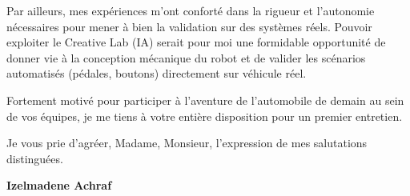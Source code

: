 \documentclass[10pt,a4paper]{../../altacv}
\begin{document}
\vspace{0.4cm}

Par ailleurs, mes expériences m'ont conforté dans la rigueur et l'autonomie nécessaires pour mener à bien la validation sur des systèmes réels. Pouvoir exploiter le Creative Lab (IA) serait pour moi une formidable opportunité de donner vie à la conception mécanique du robot et de valider les scénarios automatisés (pédales, boutons) directement sur véhicule réel.

\vspace{0.4cm}

Fortement motivé pour participer à l'aventure de l'automobile de demain au sein de vos équipes, je me tiens à votre entière disposition pour un premier entretien.

\vspace{0.5cm}

Je vous prie d'agréer, Madame, Monsieur, l'expression de mes salutations distinguées.

\vfill

\begin{flushright}
  \Large\color{emphasis}\textbf{Izelmadene Achraf}
\end{flushright}
\end{document}
